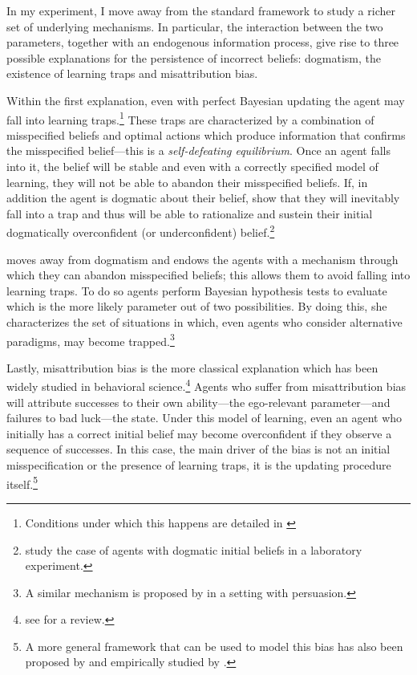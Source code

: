 \documentclass[
  12pt,
]{article}
\begin{document}
In my experiment, I move away from the standard framework to study a
richer set of underlying mechanisms. In particular, the interaction
between the two parameters, together with an endogenous information
process, give rise to three possible explanations for the persistence of
incorrect beliefs: dogmatism, the existence of learning traps and
misattribution bias.

Within the first explanation, even with perfect Bayesian updating the
agent may fall into learning
traps.\footnote{Conditions under which this happens are detailed in \citet{Hestermann2021}}
These traps are characterized by a combination of misspecified beliefs
and optimal actions which produce information that confirms the
misspecified belief---this is a \emph{self-defeating equilibrium}. Once
an agent falls into it, the belief will be stable and even with a
correctly specified model of learning, they will not be able to abandon
their misspecified beliefs. If, in addition the agent is dogmatic about
their belief, \citet{Heidhues2018} show that they will inevitably fall
into a trap and thus will be able to rationalize and sustein their
initial dogmatically overconfident (or underconfident)
belief.\footnote{\citet{Gotte2022} study the case of agents with dogmatic initial beliefs in a 
laboratory experiment.}

\citet{Ba2023} moves away from dogmatism and endows the agents with a
mechanism through which they can abandon misspecified beliefs; this
allows them to avoid falling into learning traps. To do so agents
perform Bayesian hypothesis tests to evaluate which is the more likely
parameter out of two possibilities. By doing this, she characterizes the
set of situations in which, even agents who consider alternative
paradigms, may become trapped.\footnote{A 
similar mechanism is proposed by \citet{Schwarstein2021} in a setting with persuasion.}

Lastly, misattribution bias is the more classical explanation which has
been widely studied in behavioral
science.\footnote{see \citet{kelley1980} for a review.} Agents who
suffer from misattribution bias will attribute successes to their own
ability---the ego-relevant parameter---and failures to bad luck---the
state. Under this model of learning, even an agent who initially has a
correct initial belief may become overconfident if they observe a
sequence of successes. In this case, the main driver of the bias is not
an initial misspecification or the presence of learning traps, it is the
updating procedure
itself.\footnote{A more general framework that can be used to model 
this bias has also been proposed by \citet{Brunnermeier2005} and empirically studied by \citet{Bracha2012}.}
\end{document}
